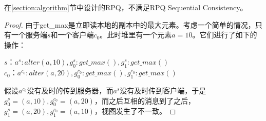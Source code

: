 			\begin{theorem}
				在\ref{section:algorithm}节中设计的RPQ，不满足RPQ Sequential Consistency。
			\end{theorem}
			\begin{proof}
				由于get\_max是立即读本地的副本中的最大元素。考虑一个简单的情况，只有一个服务端$s$和一个客户端$c_0$。此时堆里有一个元素$a=10$。它们进行了如下的操作：
				\begin{center}
					$s$：$a^s:alter(a,10), g^s_0:get\_max(), g^s_1:get\_max()$\\
					$c_0$：$a^{c_0}:alter(a,20), g^{c_0}_0:get\_max(), g^{c_0}_1:get\_max()$
				\end{center}
				假设$a^{c_0}$没有及时的传到服务器，而$a^s$没有及时传到客户端，于是$g^s_0=(a,10),g^{c_0}_0=(a,20)$，而之后互相的消息到了之后，$g^s_1=(a,20),g^{c_0}_1=(a,10)$，视图发生了不一致。
			\end{proof}
